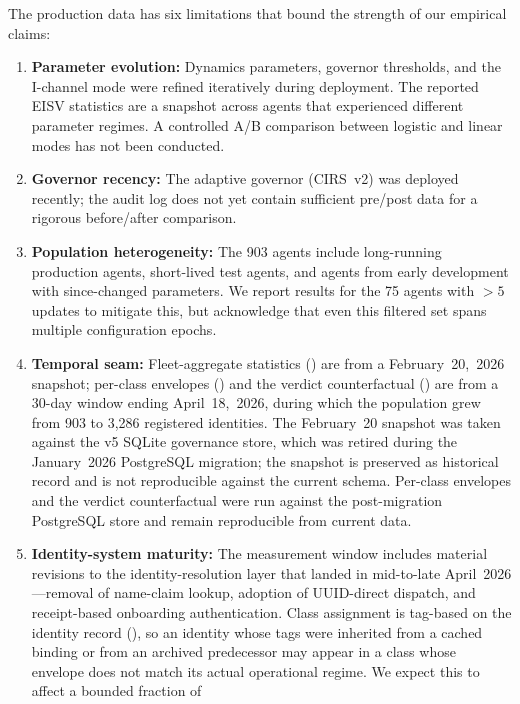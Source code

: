 \documentclass[11pt,twocolumn]{article}
\begin{document}
The production data has six limitations that bound the strength of
our empirical claims:
\begin{enumerate}
\item \textbf{Parameter evolution:} Dynamics parameters, governor
  thresholds, and the I-channel mode were refined iteratively during
  deployment. The reported EISV statistics are a snapshot across agents
  that experienced different parameter regimes. A controlled A/B
  comparison between logistic and linear modes has not been conducted.
\item \textbf{Governor recency:} The adaptive governor (CIRS~v2) was
  deployed recently; the audit log does not yet contain sufficient
  pre/post data for a rigorous before/after comparison.
\item \textbf{Population heterogeneity:} The 903 agents include
  long-running production agents, short-lived test agents, and agents
  from early development with since-changed parameters. We report
  results for the 75 agents with $>5$ updates to mitigate this, but
  acknowledge that even this filtered set spans multiple configuration
  epochs.
\item \textbf{Temporal seam:} Fleet-aggregate statistics
  () are from a February~20,~2026 snapshot;
  per-class envelopes () and the
  verdict counterfactual () are
  from a 30-day window ending April~18,~2026, during which the
  population grew from 903 to 3{,}286 registered identities.
  The February~20 snapshot was taken against the v5 SQLite governance
  store, which was retired during the January~2026 PostgreSQL
  migration; the snapshot is preserved as historical record and is
  not reproducible against the current schema. Per-class envelopes
  and the verdict counterfactual were run against the post-migration
  PostgreSQL store and remain reproducible from current data.
\item \textbf{Identity-system maturity:} The measurement window
  includes material revisions to the identity-resolution layer that
  landed in mid-to-late April~2026---removal of name-claim lookup,
  adoption of UUID-direct dispatch, and receipt-based onboarding
  authentication. Class assignment is tag-based on the identity record
  (), so an identity whose tags were
  inherited from a cached binding or from an archived predecessor
  may appear in a class whose envelope does not match its actual
  operational regime. We expect this to affect a bounded fraction of

\end{enumerate}
\end{document}
